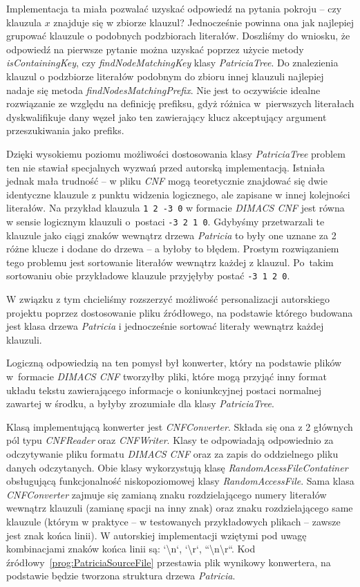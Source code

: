 		Implementacja ta miała pozwalać uzyskać odpowiedź na pytania pokroju -- czy klauzula $x$ znajduje się w zbiorze klauzul? Jednocześnie powinna ona jak najlepiej grupować klauzule o podobnych podzbiorach literałów. Doszliśmy do wniosku, że odpowiedź na pierwsze pytanie można uzyskać poprzez użycie metody \emph{isContainingKey}, czy \emph{findNodeMatchingKey} klasy \emph{PatriciaTree}. Do znalezienia klauzul o podzbiorze literałów podobnym do zbioru innej klauzuli najlepiej nadaje się metoda \emph{findNodesMatchingPrefix}. Nie jest to oczywiście idealne rozwiązanie ze względu na definicję prefiksu, gdyż różnica w~pierwszych literałach dyskwalifikuje dany węzeł jako ten zawierający klucz akceptujący argument przeszukiwania jako prefiks.
		
		Dzięki wysokiemu poziomu możliwości dostosowania klasy \emph{PatriciaTree} problem ten nie stawiał specjalnych wyzwań przed autorską implementacją. Istniała jednak mała trudność -- w pliku \emph{CNF} mogą teoretycznie znajdować się dwie identyczne klauzule z punktu widzenia logicznego, ale zapisane w innej kolejności literałów. Na przykład klauzula \texttt{1 2 -3 0} w formacie \emph{DIMACS CNF} jest równa w sensie logicznym klauzuli o~postaci \texttt{-3 2 1 0}. Gdybyśmy przetwarzali te klauzule jako ciągi znaków wewnątrz drzewa \emph{Patricia} to były one uznane za 2 różne klucze i dodane do drzewa -- a byłoby to błędem. Prostym rozwiązaniem tego problemu jest sortowanie literałów wewnątrz każdej z klauzul. Po~takim sortowaniu obie przykładowe klauzule przyjęłyby postać \texttt{-3 1 2 0}.
		
		W związku z tym chcieliśmy rozszerzyć możliwość personalizacji autorskiego projektu poprzez dostosowanie pliku źródłowego, na podstawie którego budowana jest klasa drzewa \emph{Patricia} i jednocześnie sortować literały wewnątrz każdej klauzuli.
		
		Logiczną odpowiedzią na ten pomysł był konwerter, który na podstawie plików w~formacie \emph{DIMACS CNF} tworzyłby pliki, które mogą przyjąć inny format układu tekstu zawierającego informacje o koniunkcyjnej postaci normalnej zawartej w środku, a byłyby zrozumiałe dla klasy \emph{PatriciaTree}.
		
		Klasą implementującą konwerter jest \emph{CNFConverter}. Składa się ona z 2 głównych pól typu \emph{CNFReader} oraz \emph{CNFWriter}. Klasy te odpowiadają odpowiednio za odczytywanie pliku formatu \emph{DIMACS CNF} oraz za zapis do oddzielnego pliku danych odczytanych. Obie klasy wykorzystują klasę \emph{RandomAcessFileContatiner} obsługującą funkcjonalność niskopoziomowej klasy \emph{RandomAccessFile}. Sama klasa \emph{CNFConverter} zajmuje się zamianą znaku rozdzielającego numery literałów wewnątrz klauzuli (zamianę spacji na inny znak) oraz znaku rozdzielającego same klauzule (którym w praktyce -- w testowanych przykładowych plikach -- zawsze jest znak końca linii). W autorskiej implementacji wziętymi pod uwagę kombinacjami znaków końca linii są: `\textbackslash n`, `\textbackslash r`, ``\textbackslash n\textbackslash r``. Kod źródłowy~\ref{prog:PatriciaSourceFile} przestawia plik wynikowy konwertera, na podstawie będzie tworzona struktura drzewa \emph{Patricia}.
		
